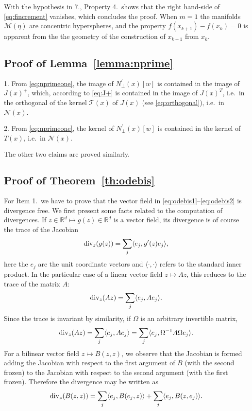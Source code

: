 \documentclass[10pt]{article}
\newcommand{\Npperp}{N^\prime_\perp}
\newcommand{\bbR}{\mathbb R}
\begin{document}
With the hypothesis in  7., Property 4.\ shows that the right hand-side of \eqref{eq:fincrement} vanishes, which concludes the proof. When \(m=1\) the manifolds \({\mathcal M}(\eta)\) are concentric hyperspheres, and the property \(f(x_{k+1})-f(x_k)=0\) is apparent from the the geometry of the construction of \(x_{k+1}\) from \(x_k\).

\subsection{Proof of Lemma~\ref{lemma:nprime}}

1. From \eqref{eq:nprimeone}, the image of \(\Npperp(x)[w]\)  is contained in the image of \(J(x)^+\), which, according to \eqref{eq:J+} is contained in the image of \(J(x)^T\), i.e.\ in the orthogonal of the kernel \({\mathcal T}(x)\) of \(J(x)\) (see \eqref{eq:orthogonal}), i.e.\ in \({\mathcal N}(x)\).

2. From \eqref{eq:nprimeone}, the kernel of \(\Npperp(x)[w]\)  is contained in the kernel of \(T(x)\), i.e.\ in \({\mathcal N}(x)\).

The other two claims are proved similarly.

\subsection{Proof of Theorem~\ref{th:odebis}}

For Item 1.\ we have to prove that the vector field in \eqref{eq:odebis1}--\eqref{eq:odebis2} is divergence free. We first present some facts related to the computation of divergences.
 If \(z\in\bbR^d\mapsto g(z)\in\bbR^d\) is a vector field, its divergence is of course the trace of the Jacobian
\begin{equation}\label{eq:div}
{\rm div}_z(g(z)) = \sum_j \langle e_j, g^\prime(z)e_j\rangle,
\end{equation}
here the \(e_j\) are the unit coordinate vectors and \(\langle\cdot,\cdot\rangle\) refers to the standard inner product. In the particular case of a linear vector field \(z\mapsto Az\), this reduces to the trace of the matrix \(A\):
\[
{\rm div}_z(Az) = \sum_j \langle e_j, Ae_j\rangle.
\]
Since the trace is invariant by similarity, if \(\Omega\) is an arbitrary invertible matrix,
\begin{equation}\label{eq:divsimilarity}
{\rm div}_z(Az) = \sum_j \langle e_j, Ae_j\rangle =
\sum_j \langle e_j, \Omega^{-1}A\Omega e_j\rangle.
\end{equation}
For a bilinear vector field \(z\mapsto B(z,z)\), we observe that the Jacobian is formed adding the Jacobian with respect to the first argument of \(B\) (with the second frozen) to the Jacobian with respect to the second argument (with the first frozen). Therefore the divergence may be written as
\begin{equation}\label{eq:divbilinear}
{\rm div}_z(B(z,z)) =
\sum_j \langle e_j, B(e_j,z) \rangle+\sum_j \langle e_j, B(z,e_j) \rangle.
\end{equation}
\end{document}
